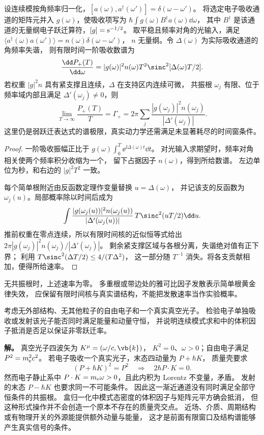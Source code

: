 \begin{proposition}[连续频率共振根的雅可比因子]
设连续模按角频率归一化，$[a(\omega),a^\dagger(\omega')]=\delta(\omega-\omega')$。
将选定电子吸收通道的矩阵元并入 $g(\omega)$，使吸收项写为
$\hbar\int g(\omega)B^\dagger a(\omega)\dd\omega$，
其中 $B^\dagger$ 是该通道的无量纲电子跃迁算符，$[g]={\rm s^{-1/2}}$。
取平稳且频率对角的光输入，满足
$\langle a^\dagger(\omega)a(\omega')\rangle=n(\omega)\delta(\omega-\omega')$，
$n$ 无量纲。令 $\Delta(\omega)$ 为实际吸收通道的角频率失谐，
则有限时间一阶吸收数谱为
\begin{equation}
 \frac{\dd P_+(T)}{\dd\omega}=|g(\omega)|^2 n(\omega)
 T^2\sinc^2[\Delta(\omega)T/2].
 \label{eq:feqo-continuum-mode-amplitude}
\end{equation}
若权重 $|g|^2n$ 具有紧支撑且连续，$\Delta$ 在支持区内连续可微，
共振根 $\omega_j$ 有限、位于频率域内部且满足 $\Delta'(\omega_j)\ne0$，则
\begin{equation}
 \lim_{T\to\infty}\frac{P_+(T)}T=
 \Gamma_+=2\pi\sum_j\frac{|g(\omega_j)|^2n(\omega_j)}{|\Delta'(\omega_j)|}.
 \label{eq:feqo-continuum-absorption}
\end{equation}
这里仍是弱跃迁表达式的谱极限，真实动力学还需满足未显著耗尽的时间窗条件。
\end{proposition}
\begin{proof}
一阶吸收振幅正比于 $g(\omega)\int_0^T\ee^{\ii\Delta(\omega)t}\dd t$。
对光输入求期望时，频率对角相关使两个频率积分收缩为一个，
留下占据因子 $n(\omega)$，得到所给数谱。
左边单位为秒，和右边的 $|g|^2T^2$ 一致。

每个简单根附近由反函数定理作变量替换 $u=\Delta(\omega)$，
并记该支的反函数为 $\omega_j(u)$。局部概率除以时间后成为
\[
\int\frac{|g(\omega_j(u))|^2n(\omega_j(u))}
{|\Delta'(\omega_j(u))|}\,
T\sinc^2(uT/2)\dd u.
\]
推前权重在零点连续，所以有限时间核的近似恒等式给出
$2\pi|g(\omega_j)|^2n(\omega_j)/|\Delta'(\omega_j)|$。
剩余紧支撑区域与各根分离，失谐绝对值有正下界；
利用 $T\sinc^2(\Delta T/2)\le4/(T\Delta^2)$，
这一部分随 $T^{-1}$ 消失。将各支贡献相加，便得所给速率。
\end{proof}

无共振根时，上述速率为零。
多重根或带边处的雅可比因子发散表示简单根黄金律失效，
应保留有限时间核与真实谱结构，不能把发散速率当作实验概率。

\begin{exbox}[真空单光子通道是否存在]
考虑无外部结构、无其他粒子的自由电子和一个真实真空光子。
检验电子单独吸收或发射该光子能否同时满足能量和动量守恒，
并说明连续模式求和中的体积因子抵消是否足以保证非零跃迁率。

\textbf{解。} 真空光子四波矢为 $K^\mu=(\omega/c,\vb{k})$，
$K^2=0$、$\omega>0$；自由电子满足 $P^2=m_{\rm e}^2c^2$。
若电子吸收一个真实光子，末态四动量为 $P+\hbar K$，
质量壳要求
\[
(P+\hbar K)^2=P^2\quad\Longrightarrow\quad 2\hbar P\cdot K=0.
\]
然而电子静止系中 $P\cdot K=m_{\rm e}\omega>0$，且此内积为 Lorentz 不变量，矛盾。
发射的末态 $P-\hbar K$ 也要求同一不可能条件。
因此这一渐近通道没有同时满足全部守恒条件的共振根。
盒归一化中模式态密度的体积因子与矩阵元平方确会抵消，
但这种形式操作并不会创造一个原本不存在的质量壳交点。
近场、介质、周期结构或有物理开关的外源能提供额外动量与能量，
这才是前面有限窗口及结构谱能够产生真实信号的条件。
\end{exbox}
